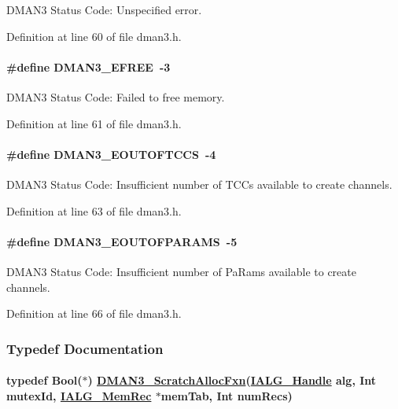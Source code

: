 DMAN3 Status Code: Unspecified error. 

Definition at line 60 of file dman3.h.\hypertarget{group___d_s_p_d_m_a_n3_g097f382f6603cc69c2d998c0ce6b9dfe}{
\paragraph[DMAN3\_\-EFREE]{\setlength{\rightskip}{0pt plus 5cm}\#define DMAN3\_\-EFREE~-3}\hfill}
\label{group___d_s_p_d_m_a_n3_g097f382f6603cc69c2d998c0ce6b9dfe}


DMAN3 Status Code: Failed to free memory. 

Definition at line 61 of file dman3.h.\hypertarget{group___d_s_p_d_m_a_n3_gb04511fe9f738b3a189758163e75f1d2}{
\paragraph[DMAN3\_\-EOUTOFTCCS]{\setlength{\rightskip}{0pt plus 5cm}\#define DMAN3\_\-EOUTOFTCCS~-4}\hfill}
\label{group___d_s_p_d_m_a_n3_gb04511fe9f738b3a189758163e75f1d2}


DMAN3 Status Code: Insufficient number of TCCs available to create channels. 

Definition at line 63 of file dman3.h.\hypertarget{group___d_s_p_d_m_a_n3_g45977d32b34b6e98e33b6510c9164dee}{
\paragraph[DMAN3\_\-EOUTOFPARAMS]{\setlength{\rightskip}{0pt plus 5cm}\#define DMAN3\_\-EOUTOFPARAMS~-5}\hfill}
\label{group___d_s_p_d_m_a_n3_g45977d32b34b6e98e33b6510c9164dee}


DMAN3 Status Code: Insufficient number of Pa\-Rams available to create channels. 

Definition at line 66 of file dman3.h.

\subsubsection{Typedef Documentation}
\hypertarget{group___d_s_p_d_m_a_n3_gb88a4f4fc347844728e7c0d6b46c5ecf}{
\paragraph[DMAN3\_\-ScratchAllocFxn]{\setlength{\rightskip}{0pt plus 5cm}typedef Bool($\ast$) \hyperlink{group___d_s_p_d_m_a_n3_gb88a4f4fc347844728e7c0d6b46c5ecf}{DMAN3\_\-Scratch\-Alloc\-Fxn}(\hyperlink{struct_i_a_l_g___obj}{IALG\_\-Handle} alg, Int mutex\-Id, \hyperlink{struct_i_a_l_g___mem_rec}{IALG\_\-Mem\-Rec} $\ast$mem\-Tab, Int num\-Recs)}\hfill}
\label{group___d_s_p_d_m_a_n3_gb88a4f4fc347844728e7c0d6b46c5ecf}


